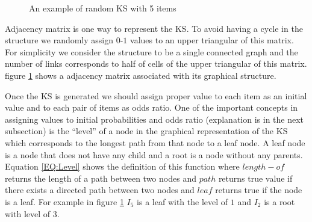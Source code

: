 \begin{figure}[t]
\centering 
{}
\qquad
\qquad
{}

\label{fig:KSExample}
\caption{An example of random KS with 5 items}
\end{figure}

Adjacency matrix  is one way to represent the KS. To avoid having a cycle in the structure we randomly assign $0$-$1$ values to an upper triangular of this matrix. For simplicity we consider the structure to be a single connected graph and the number of links corresponds to half of cells of the upper triangular of this matrix. figure \ref{fig:KSExample} shows a adjacency matrix associated with its graphical structure. 

Once the KS is generated we should assign proper value to each item as an initial value and to each pair of items as odds ratio. One of the important concepts in assigning values to initial probabilities and odds ratio (explanation is in the next subsection) is the ``level'' of a node in the graphical representation of the KS which corresponds to the longest path from that node to a leaf node. A leaf node is a node that does not have any child and a root is a node without any parents. Equation \ref{EQ:Level} shows the definition of this function where $length-of$ returns the length of a path between two nodes and $path$ returns true value if there exists a directed path between two nodes and $leaf$ returns true if the node is a leaf.  For example in figure \ref{fig:KSExample} $I_{5}$ is a leaf with the level of $1$ and $I_{2}$ is a root with level of $3$.

